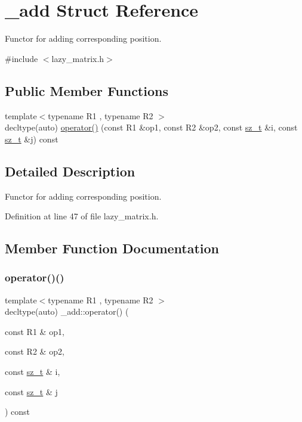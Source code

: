 \hypertarget{struct__add}{}\section{\+\_\+add Struct Reference}
\label{struct__add}


Functor for adding corresponding position.  




{\ttfamily \#include $<$lazy\+\_\+matrix.\+h$>$}

\subsection*{Public Member Functions}
\begin{DoxyCompactItemize}
\item 
{\footnotesize template$<$typename R1 , typename R2 $>$ }\\decltype(auto) \mbox{\hyperlink{struct__add_a6e89e6b34172d178dde4f429d10edf9a}{operator()}} (const R1 \&op1, const R2 \&op2, const \mbox{\hyperlink{lazy__matrix_8h_acba2745dcfc55b2d05ff45adc6a0a015}{sz\+\_\+t}} \&i, const \mbox{\hyperlink{lazy__matrix_8h_acba2745dcfc55b2d05ff45adc6a0a015}{sz\+\_\+t}} \&j) const
\end{DoxyCompactItemize}


\subsection{Detailed Description}
Functor for adding corresponding position. 

Definition at line 47 of file lazy\+\_\+matrix.\+h.



\subsection{Member Function Documentation}
\mbox{\label{struct__add_a6e89e6b34172d178dde4f429d10edf9a}} 
\subsubsection{\texorpdfstring{operator()()}{operator()()}}
{\footnotesize\ttfamily template$<$typename R1 , typename R2 $>$ \\
decltype(auto) \+\_\+add\+::operator() (\begin{DoxyParamCaption}\item[{const R1 \&}]{op1,  }\item[{const R2 \&}]{op2,  }\item[{const \mbox{\hyperlink{lazy__matrix_8h_acba2745dcfc55b2d05ff45adc6a0a015}{sz\+\_\+t}} \&}]{i,  }\item[{const \mbox{\hyperlink{lazy__matrix_8h_acba2745dcfc55b2d05ff45adc6a0a015}{sz\+\_\+t}} \&}]{j }\end{DoxyParamCaption}) const\hspace{0.3cm}{\ttfamily [inline]}}



